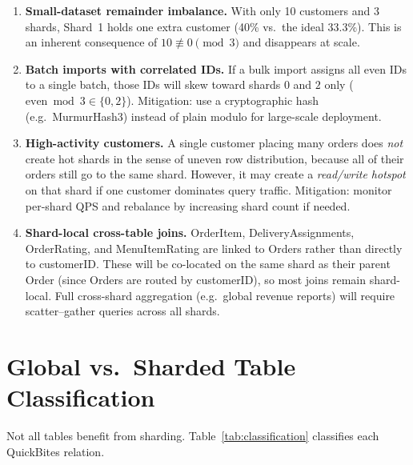 \documentclass[12pt, a4paper]{article}
\renewcommand{\_}{\plainunderscore\allowbreak}
\begin{document}
\begin{enumerate}[leftmargin=*, label=\arabic*.]
  \item \textbf{Small-dataset remainder imbalance.}
        With only 10 customers and 3 shards, Shard~1 holds one extra customer
        (40\% vs.\ the ideal 33.3\%). This is an inherent consequence of
        $10 \not\equiv 0 \pmod{3}$ and disappears at scale.

  \item \textbf{Batch imports with correlated IDs.}
        If a bulk import assigns all even IDs to a single batch, those IDs
        will skew toward shards $0$ and $2$ only
        ($\text{even} \bmod 3 \in \{0, 2\}$). Mitigation: use a
        cryptographic hash (e.g.\ MurmurHash3) instead of plain modulo
        for large-scale deployment.

  \item \textbf{High-activity customers.}
        A single customer placing many orders does \emph{not} create hot
        shards in the sense of uneven row distribution, because all of their
        orders still go to the same shard. However, it may create a
        \emph{read/write hotspot} on that shard if one customer dominates
        query traffic. Mitigation: monitor per-shard QPS and rebalance by
        increasing shard count if needed.

  \item \textbf{Shard-local cross-table joins.}
        OrderItem, Delivery\_Assignments, OrderRating, and MenuItemRating
        are linked to Orders rather than directly to customerID. These will
        be co-located on the same shard as their parent Order (since
        Orders are routed by customerID), so most joins remain shard-local.
        Full cross-shard aggregation (e.g.\ global revenue reports) will
        require scatter--gather queries across all shards.
\end{enumerate}

\section{Global vs.\ Sharded Table Classification}

Not all tables benefit from sharding. Table~\ref{tab:classification}
classifies each QuickBites relation.
\end{document}
